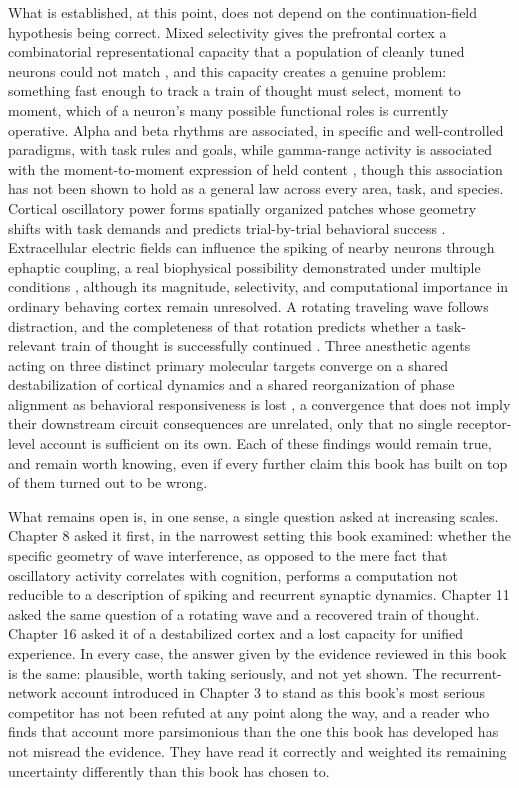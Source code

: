 \documentclass[11pt]{book}
\begin{document}
What is established, at this point, does not depend on the continuation-field hypothesis being correct. Mixed selectivity gives the prefrontal cortex a combinatorial representational capacity that a population of cleanly tuned neurons could not match \cite{rigotti2013}, and this capacity creates a genuine problem: something fast enough to track a train of thought must select, moment to moment, which of a neuron's many possible functional roles is currently operative. Alpha and beta rhythms are associated, in specific and well-controlled paradigms, with task rules and goals, while gamma-range activity is associated with the moment-to-moment expression of held content \cite{lundqvist2016}, though this association has not been shown to hold as a general law across every area, task, and species. Cortical oscillatory power forms spatially organized patches whose geometry shifts with task demands and predicts trial-by-trial behavioral success \cite{lundqvist2023,chen2026}. Extracellular electric fields can influence the spiking of nearby neurons through ephaptic coupling, a real biophysical possibility demonstrated under multiple conditions \cite{pinotsis2023,pinotsis2026}, although its magnitude, selectivity, and computational importance in ordinary behaving cortex remain unresolved. A rotating traveling wave follows distraction, and the completeness of that rotation predicts whether a task-relevant train of thought is successfully continued \cite{batabyal2025}. Three anesthetic agents acting on three distinct primary molecular targets converge on a shared destabilization of cortical dynamics and a shared reorganization of phase alignment as behavioral responsiveness is lost \cite{eisen2026,bardon2025}, a convergence that does not imply their downstream circuit consequences are unrelated, only that no single receptor-level account is sufficient on its own. Each of these findings would remain true, and remain worth knowing, even if every further claim this book has built on top of them turned out to be wrong.

What remains open is, in one sense, a single question asked at increasing scales. Chapter 8 asked it first, in the narrowest setting this book examined: whether the specific geometry of wave interference, as opposed to the mere fact that oscillatory activity correlates with cognition, performs a computation not reducible to a description of spiking and recurrent synaptic dynamics. Chapter 11 asked the same question of a rotating wave and a recovered train of thought. Chapter 16 asked it of a destabilized cortex and a lost capacity for unified experience. In every case, the answer given by the evidence reviewed in this book is the same: plausible, worth taking seriously, and not yet shown. The recurrent-network account introduced in Chapter 3 to stand as this book's most serious competitor has not been refuted at any point along the way, and a reader who finds that account more parsimonious than the one this book has developed has not misread the evidence. They have read it correctly and weighted its remaining uncertainty differently than this book has chosen to.
\end{document}
